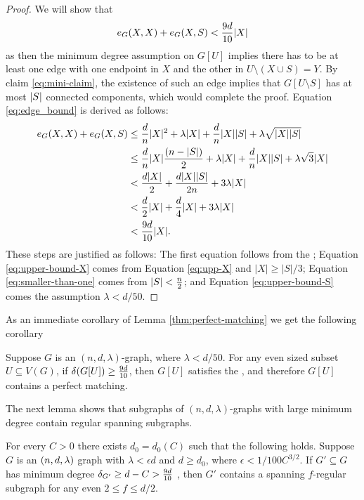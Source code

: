 \documentclass[11pt]{article}
\begin{document}
\begin{proof}
  We will show that
    \begin{equation} \label{eq:edge_bound}
        \CutEdges{X}{X}{G} + \CutEdges{X}{S}{G} < \cTilde|X|
    \end{equation}
    as then the minimum degree assumption on $G[U]$ implies there has to be at least one edge with one endpoint in $X$ and the other in $U \setminus (X \cup S) = Y$. By claim \eqref{eq:mini-claim}, the existence of such an edge implies that $G[U\setminus S]$ has at most $\Size{S}$ connected components, which would complete the proof.
    Equation \eqref{eq:edge_bound} is derived as follows: 
\begin{align}
  \CutEdges{X}{X}{G} + \CutEdges{X}{S}{G} &\le \frac{d}{n}|X|^2 + \lambda |X| + \frac{d}{n}|X||S| + \lambda\sqrt{|X||S|}        \\
&\le \frac{d}{n} |X| \frac{(n-|S|)}{2} + \lambda |X| + \frac{d}{n}|X||S| + \lambda\sqrt{3} |X| \label{eq:upper-bound-X}  \\
&< \frac{d|X|}{2} + \frac{d|X||S|}{2n} + 3 \lambda |X|\\
&< \frac{d}{2}|X| + \frac{d}{4}|X| + 3 \lambda |X| \label{eq:smaller-than-one} \\
&< \cTilde|X|.  \label{eq:upper-bound-S}
\end{align}
These steps are justified as follows: The first equation follows from the ; Equation \eqref{eq:upper-bound-X} comes from Equation \eqref{eq:upp-X} and $|X| \ge |S|/3$;
Equation \eqref{eq:smaller-than-one} comes from $\Size{S} < \frac{n}{2}$; and  Equation \eqref{eq:upper-bound-S} comes the assumption $\lambda < d/50$.
\end{proof}

As an immediate corollary of Lemma \ref{thm:perfect-matching} we get the following corollary
\begin{corollary}\label{cor:perfect-matching}
Suppose $G$ is an $(n, d, \lambda)$-graph, where $\lambda < d/50$. 
For any even sized subset $U \subseteq V(G)$, if $\delta(G[U]) \ge \cTilde$, then $G[U]$ satisfies the , and therefore $G[U]$ contains a perfect matching.  
\end{corollary}

The next lemma shows that subgraphs of $(n, d, \lambda)$-graphs with large minimum degree contain regular spanning subgraphs.

\begin{lemma}\label{lemma:f-factor}
  For every $C > 0$ there exists $d_0 = d_0(C)$ such that the following holds.
Suppose $G$ is an $\EnDeeLambda$ graph with $\lambda < \epsilon d$ and $d \ge d_0$, where $\epsilon < 1/100C^{3/2}$.
If $G' \subseteq G$ has minimum degree $\MinimalDegree{G'} \ge d - C > \frac{9d}{10}$ , then $G'$ contains a spanning $f$-regular subgraph for any even $2 \le f \le d/2$.
\end{lemma}
\end{document}
